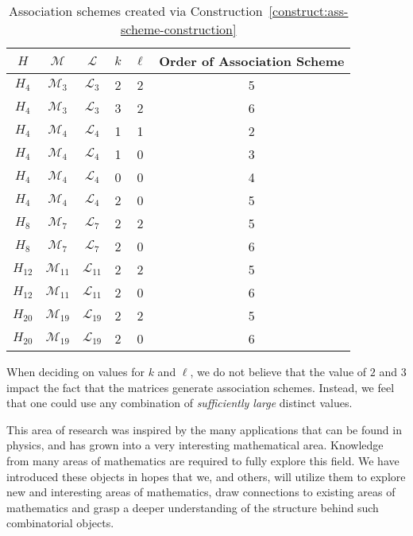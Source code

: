 \begin{table}[H]
\caption{Association schemes created via Construction~\ref{construct:ass-scheme-construction}}
\centering
\label{table:ass-schemes}
\begin{tabular}{@{}cccccc@{}}
\hline
\toprule
$H$ &
$\mathcal{M}$ &
$\mathcal{L}$ &
$k$ &
$\ell$ &
Order of Association Scheme\\
\midrule
$H_{4}$  & $\mathcal{M}_{3}$  & $\mathcal{L}_{3}$  & 2 & 2 & 5\\
$H_{4}$  & $\mathcal{M}_{3}$  & $\mathcal{L}_{3}$  & 3 & 2 & 6\\
\midrule
$H_{4}$  & $\mathcal{M}_{4}$  & $\mathcal{L}_{4}$  & 1 & 1 & 2\\
$H_{4}$  & $\mathcal{M}_{4}$  & $\mathcal{L}_{4}$  & 1 & 0 & 3\\
$H_{4}$  & $\mathcal{M}_{4}$  & $\mathcal{L}_{4}$  & 0 & 0 & 4\\
$H_{4}$  & $\mathcal{M}_{4}$  & $\mathcal{L}_{4}$  & 2 & 0 & 5\\
\midrule
$H_{8}$  & $\mathcal{M}_{7}$  & $\mathcal{L}_{7}$  & 2 & 2 & 5\\
$H_{8}$  & $\mathcal{M}_{7}$  & $\mathcal{L}_{7}$  & 2 & 0 & 6\\
\midrule
$H_{12}$ & $\mathcal{M}_{11}$ & $\mathcal{L}_{11}$ & 2 & 2 & 5\\
$H_{12}$ & $\mathcal{M}_{11}$ & $\mathcal{L}_{11}$ & 2 & 0 & 6\\
\midrule
$H_{20}$ & $\mathcal{M}_{19}$ & $\mathcal{L}_{19}$ & 2 & 2 & 5\\
$H_{20}$ & $\mathcal{M}_{19}$ & $\mathcal{L}_{19}$ & 2 & 0 & 6\\
\bottomrule
 \end{tabular}
\end{table}

When deciding on values for $k$ and $\ell$, we do not believe that the value of $2$ and $3$ impact the fact that the matrices generate association schemes. Instead, we feel that one could use any combination of {\it sufficiently large} distinct values.

This area of research was inspired by the many applications that can be found in physics, and has grown into a very interesting mathematical area. Knowledge from many areas of mathematics are required to fully explore this field. We have introduced these objects in hopes that we, and others, will utilize them to explore new and interesting areas of mathematics, draw connections to existing areas of mathematics and grasp a deeper understanding of the structure behind such combinatorial objects.
